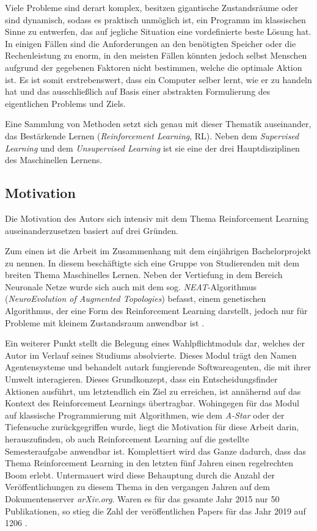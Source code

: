 Viele Probleme sind derart komplex, besitzen gigantische Zustandsräume oder sind dynamisch, sodass es praktisch unmöglich ist, ein Programm im klassischen Sinne zu entwerfen, das auf jegliche Situation eine vordefinierte beste Lösung hat. In einigen Fällen sind die Anforderungen an den benötigten Speicher oder die Rechenleistung zu enorm, in den meisten Fällen könnten jedoch selbst Menschen aufgrund der gegebenen Faktoren nicht bestimmen, welche die optimale Aktion ist. Es ist somit erstrebenswert, dass ein Computer selber lernt, wie er zu handeln hat und das ausschließlich auf Basis  einer abstrakten Formulierung des eigentlichen Problems und Ziels. \par 
Eine Sammlung von Methoden setzt sich genau mit dieser Thematik auseinander, das Bestärkende Lernen (\textit{Reinforcement Learning}, RL). Neben dem \textit{Supervised Learning} und dem \textit{Unsupervised Learning} ist sie eine der drei Hauptdisziplinen des Maschinellen Lernens.


\subsection{Motivation}
Die Motivation des Autors sich intensiv mit dem Thema Reinforcement Learning auseinanderzusetzen basiert auf drei Gründen.
\par 
Zum einen ist die Arbeit im Zusammenhang mit dem einjährigen Bachelorprojekt zu nennen. In diesem beschäftigte sich eine Gruppe von Studierenden mit dem breiten Thema \glqq Maschinelles Lernen\grqq{}. Neben der Vertiefung in dem Bereich \glqq Neuronale Netze\grqq{} wurde sich auch mit dem sog. \textit{NEAT}-Algorithmus (\textit{NeuroEvolution of Augmented Topologies}) befasst, einem genetischen Algorithmus, der eine Form des Reinforcement Learning darstellt, jedoch nur für Probleme mit kleinem Zustandsraum anwendbar ist \cite[S.~7f]{Sutton1998}.
\par
Ein weiterer Punkt stellt die Belegung eines Wahlpflichtmoduls dar, welches der Autor im Verlauf seines Studiums absolvierte. Dieses Modul trägt den Namen \glqq Agentensysteme\grqq{} und behandelt autark fungierende Softwareagenten, die mit ihrer Umwelt interagieren. Dieses Grundkonzept, dass ein Entscheidungsfinder Aktionen ausführt, um letztendlich ein Ziel zu erreichen, ist annähernd auf das Kontext des Reinforcement Learnings übertragbar. Wohingegen für das Modul auf \glqq klassische\grqq{} Programmierung mit Algorithmen, wie dem \textit{A-Star} oder der Tiefensuche zurückgegriffen wurde, liegt die Motivation für diese Arbeit darin, herauszufinden, ob auch Reinforcement Learning auf die gestellte Semesteraufgabe anwendbar ist.
\newpage
Komplettiert wird das Ganze dadurch, dass das Thema Reinforcement Learning in den letzten fünf Jahren einen regelrechten Boom erlebt. Untermauert wird diese Behauptung durch die Anzahl der Veröffentlichungen zu diesem Thema in den vergangen Jahren auf dem Dokumentenserver \textit{arXiv.org}. Waren es für das gesamte Jahr 2015 nur 50 Publikationen, so stieg die Zahl der veröffentlichen Papers für das Jahr 2019 auf 1206 \cite[]{arxiv}.


